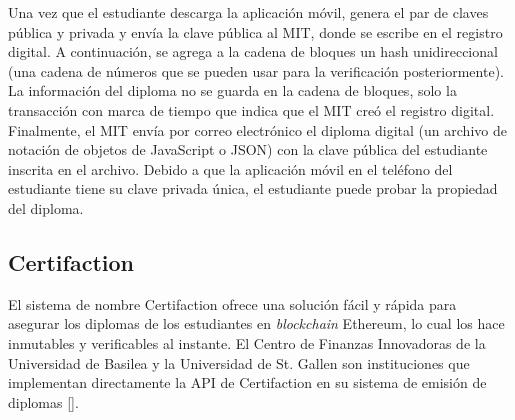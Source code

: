 

Una vez que el estudiante descarga la aplicación móvil, genera el par de claves pública y privada y envía la clave pública al MIT, donde se escribe en el registro digital. A continuación, se agrega a la cadena de bloques un hash unidireccional (una cadena de números que se pueden usar para la verificación posteriormente). La información del diploma no se guarda en la cadena de bloques, solo la transacción con marca de tiempo que indica que el MIT creó el registro digital. Finalmente, el MIT envía por correo electrónico el diploma digital (un archivo de notación de objetos de JavaScript o JSON) con la clave pública del estudiante inscrita en el archivo. Debido a que la aplicación móvil en el teléfono del estudiante tiene su clave privada única, el estudiante puede probar la propiedad del diploma.




\subsection{Certifaction}
El sistema de nombre Certifaction ofrece una solución fácil y rápida para asegurar los diplomas de los estudiantes en \textit{blockchain} Ethereum, lo cual los hace inmutables y verificables al instante. El Centro de Finanzas Innovadoras de la Universidad de Basilea y la Universidad de St. Gallen son instituciones que implementan directamente la API de Certifaction en su sistema de emisión de diplomas [\cite{82}].

